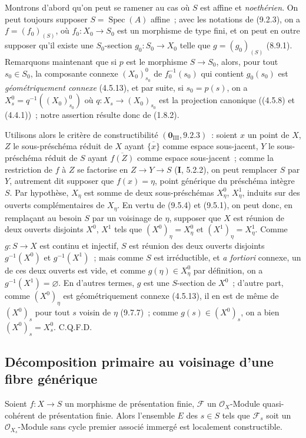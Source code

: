 Montrons d'abord qu'on peut se ramener au cas où $S$ est affine et
\emph{noethérien}. On peut toujours supposer $S=\operatorname{Spec}(A)$ affine~;
avec les notations de (9.2.3), on a $f=(f_0)_{(S)}$, où $f_0:X_0\to S_0$ est un
morphisme de type fini, et on peut en outre supposer qu'il existe une
$S_0$-section $g_0:S_0\to X_0$ telle que $g=(g_0)_{(S)}$ (8.9.1). Remarquons
maintenant que si $p$ est le morphisme $S\to S_0$, alors, pour tout $s_0\in S_0$,
la composante connexe $(X_0)^0_{s_0}$ de $f_0^{-1}(s_0)$ qui contient $g_0(s_0)$
est \emph{géométriquement connexe} (4.5.13), et par suite, si $s_0=p(s)$, on a
$X_s^0=q^{-1}((X_0)^0_{s_0})$ où $q:X_s\to(X_0)_{s_0}$ est la projection
canonique ((4.5.8) et (4.4.1))~; notre assertion résulte donc de (1.8.2).

Utilisons alors le critère de constructibilité $(\mathbf 0_{\mathrm{III}},9.2.3)$~:
soient $x$ un point de $X$, $Z$ le sous-préschéma réduit de $X$ ayant
$\overline{\{x\}}$ comme espace sous-jacent, $Y$ le sous-préschéma réduit de $S$
ayant $\overline{f(Z)}$ comme espace sous-jacent~; comme la restriction de $f$
à $Z$ se factorise en $Z\to Y\to S$ (\textbf{I}, 5.2.2), on peut remplacer $S$
par $Y$, autrement dit supposer que $f(x)=\eta$, point générique du préschéma
intègre $S$. Par hypothèse, $X_\eta$ est somme de deux sous-préschémas
$X_\eta^0$, $X_\eta^1$, induits sur des ouverts complémentaires de $X_\eta$. En
vertu de (9.5.4) et (9.5.1), on peut donc, en remplaçant au besoin $S$ par un
voisinage de $\eta$, supposer que $X$ est réunion de deux ouverts disjoints
$X^0$, $X^1$ tels que $(X^0)_\eta=X_\eta^0$ et $(X^1)_\eta=X_\eta^1$. Comme
$g:S\to X$ est continu et injectif, $S$ est réunion des deux ouverts disjoints
$g^{-1}(X^0)$ et $g^{-1}(X^1)$~; mais comme $S$ est irréductible, et
\emph{a fortiori} connexe, un de ces deux ouverts est vide, et comme
$g(\eta)\in X_\eta^0$ par définition, on a $g^{-1}(X^1)=\varnothing$. En
d'autres termes, $g$ est une $S$-section de $X^0$~; d'autre part, comme
$(X^0)_\eta$ est géométriquement connexe (4.5.13), il en est de même de
$(X^0)_s$ pour tout $s$ voisin de $\eta$ (9.7.7)~; comme
$g(s)\in(X^0)_s$, on a bien $(X^0)_s=X_s^0$. C.Q.F.D.

\subsection{Décomposition primaire au voisinage d'une fibre générique}
\label{subsection:IV.9.8-fr}

\begin{proposition}[9.8.1]
\label{IV.9.8.1-fr}
Soient $f:X\to S$ un morphisme de présentation finie, $\mathcal F$ un
$\mathcal O_X$-Module quasi-cohérent de présentation finie. Alors l'ensemble
$E$ des $s\in S$ tels que $\mathcal F_s$ soit un $\mathcal O_{X_s}$-Module sans
cycle premier associé immergé est localement constructible.
\end{proposition}

